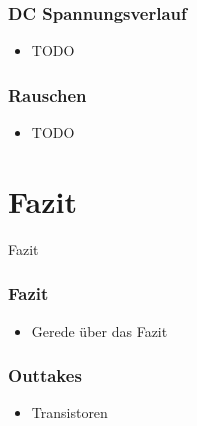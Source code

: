 \documentclass[aspectratio=32]{beamer}
\begin{document}
\begin{frame}
  \frametitle{DC Spannungsverlauf}
  \centering
  \begin{itemize}
    \item TODO
  \end{itemize}
\end{frame}

\begin{frame}
  \frametitle{Rauschen}
  \centering
  \begin{itemize}
    \item TODO
  \end{itemize}
\end{frame}


\section{Fazit}
{
  \logo{}
  \begin{frame}
    \centering
    \Large{Fazit}
  \end{frame}
}

\begin{frame}
  \frametitle{Fazit}
  \centering
  \begin{itemize}
    \item Gerede über das Fazit
  \end{itemize}
\end{frame}

\begin{frame}
  \frametitle{Outtakes}
  \centering
  \begin{itemize}
    \item Transistoren 
  \end{itemize}
\end{frame}
\end{document}
